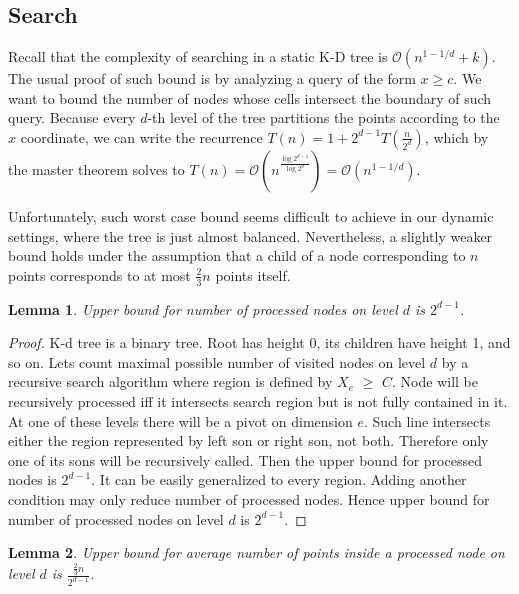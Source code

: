 \documentclass[10pt,a4paper]{article}
\newtheorem{lemma}{Lemma}
\newcommand{\Oh}{\mathcal{O}}
\begin{document}
\subsection{Search}

Recall that the complexity of searching in a static K-D tree is $\Oh(n^{1-1/d} + k)$. The usual proof of such bound is by analyzing a query of the form $x \geq c$. We want to bound the number of nodes whose cells intersect the boundary of such query. Because every $d$-th level of the tree partitions the points according to the $x$ coordinate, we can write the recurrence $T(n)=1+2^{d-1}T(\frac{n}{2^{d}})$, which by the master theorem solves to $T(n)=\Oh(n^{\frac{\log 2^{d-1}}{\log 2^{d}}})=\Oh(n^{1-1/d})$. 

Unfortunately, such worst case bound seems difficult to achieve in our dynamic settings, where the tree is just almost balanced. Nevertheless, a slightly weaker bound holds under the assumption that a child of a node corresponding to $n$ points corresponds to at most $\frac{2}{3}n$ points itself.

\begin{lemma}\label{lem:3}
Upper bound for number of processed nodes on level $d$ is $2^{d-1}$.
\end{lemma}

\begin{proof}

K-d tree is a binary tree. Root has height 0, its children have height 1, and so on. Lets count maximal possible number of visited nodes on level $d$ by a recursive search algorithm where region is defined by $X_e$ $\geq$ $C$. Node will be recursively processed iff it intersects search region but is not fully contained in it. At one of these levels there will be a pivot on dimension $e$. Such line intersects either the region represented by left son or right son, not both. Therefore only one of its sons will be recursively called. Then the upper bound for processed nodes is $2^{d-1}$. It can be easily generalized to every region. Adding another condition may only reduce number of processed nodes. Hence upper bound for number of processed nodes on level $d$ is $2^{d-1}$. 
\end{proof}


\begin{lemma}\label{lem:4}
Upper bound for average number of points inside a processed node on level $d$ is $\frac{\frac{2}{3}n}{2^{d-1}}$.
\end{lemma}
\end{document}
